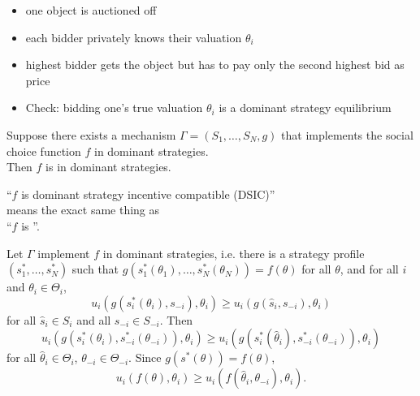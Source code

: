 \documentclass[english]{beamer}		%
\def\lyxframeend{} %
\newcommand\soutred{\bgroup\markoverwith
	{\textcolor{red}{\rule[0.55ex]{2pt}{0.8pt}}}\ULon}
\begin{document}
\begin{example}
	\begin{itemize}
		\item one object is auctioned off
		\item each bidder privately knows their valuation $\theta_{i}$ 
		\item highest bidder gets the object but has to pay only the second highest bid as price
		\item Check: bidding one's true valuation $\theta_{i}$ is a dominant strategy equilibrium
	\end{itemize}
\end{example}
\lyxframeend


\begin{theorem}
	Suppose there exists a mechanism $\Gamma=(S_{1},\dots,S_{N},g)$ that implements the social choice function $f$ in dominant strategies.\\ Then $f$ is  in dominant strategies.
\end{theorem}
\pause\medskip
\begin{definition}
	``$f$ is \alert{dominant strategy incentive compatible} (DSIC)''\\ 
	means the exact same thing as \\
	``$f$ is ''.
\end{definition}
\lyxframeend


Let $\Gamma$ implement $f$ in dominant strategies, i.e. there is a strategy profile  $(s_1^*,\dots,s_N^*)$ such that $g(s_1^*(\theta_{1}),\dots,s_N^*(\theta_{N}))=f(\theta)$ for all $\theta$, and for all $i$ and  $\theta_{i}\in\Theta_{i}$,
$$ u_{i}(g(s_{i}^{*}(\theta_{i}),s_{-i}),\theta_{i})\geq u_{i}(g(\hat s_{i},s_{-i}),\theta_{i})$$
for all $\hat s_{i}\in S_{i}$ and all $s_{-i}\in S_{-i}$. 
\pause
Then
$$ u_{i}(g(s_{i}^{*}(\theta_{i}), s_{-i}^{*}(\theta_{-i})),\theta_{i})\geq u_i (g(s^*_i(\hat{\theta}_i), s_{-i}^{*}(\theta_{-i})), \theta_i)$$
for all $\hat{\theta}_i \in \Theta_i$, $\theta_{-i} \in \Theta_{-i}$. 
\pause
Since $g(s^*(\theta)) = f(\theta)$,
$$ u_i (f(\theta),\theta_i) \geq u_i (f(\hat{\theta}_i,\theta_{-i}), \theta_i).$$
\lyxframeend


\lyxframeend
\end{document}
